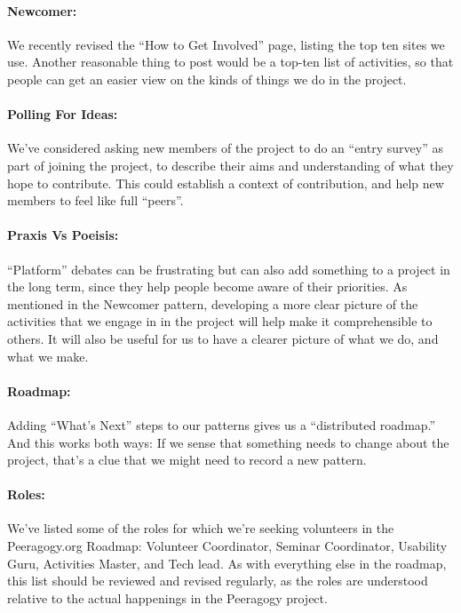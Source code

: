 \paragraph{Newcomer:} We recently revised the “How to Get Involved” page, listing the top ten
sites we use. Another reasonable thing to post would be a top-ten list
of activities, so that people can get an easier view on the kinds of
things we do in the project.

\paragraph{Polling For Ideas:} We’ve considered asking new members of the project to do an “entry survey” as part of joining the project, to describe their aims and
understanding of what they hope to contribute. This could establish a
context of contribution, and help new members to feel like full “peers”.

\paragraph{Praxis Vs Poeisis:} “Platform” debates can be frustrating but can also add something to a project in the long term, since they help people become aware of their
priorities. As mentioned in the Newcomer pattern, developing a more clear
picture of the activities that we engage in in the project will help
make it comprehensible to others. It will also be useful for us to have
a clearer picture of what we do, and what we make.

\paragraph{Roadmap:} Adding ``What's Next'' steps to our patterns gives us a ``distributed roadmap.''  And this works both ways:  
If we sense that something needs to change about the project, that's a
clue that we might need to record a new pattern.

\paragraph{Roles:} We’ve listed some of the roles for which we’re seeking volunteers in
the Peeragogy.org Roadmap: Volunteer Coordinator, Seminar Coordinator,
Usability Guru, Activities Master, and Tech lead. As with everything
else in the roadmap, this list should be reviewed and revised
regularly, as the roles are understood relative to the actual
happenings in the Peeragogy project.

